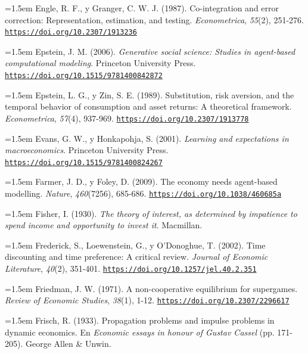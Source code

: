 \documentclass[10pt,a4paper]{article}
\begin{document}
\noindent\hangindent=1.5em Engle, R. F., y Granger, C. W. J. (1987). Co-integration and error correction: Representation, estimation, and testing. \textit{Econometrica}, \textit{55}(2), 251-276. \href{https://doi.org/10.2307/1913236}{\nolinkurl{https://doi.org/10.2307/1913236}}

\noindent\hangindent=1.5em Epstein, J. M. (2006). \textit{Generative social science: Studies in agent-based computational modeling}. Princeton University Press. \href{https://doi.org/10.1515/9781400842872}{\nolinkurl{https://doi.org/10.1515/9781400842872}}

\noindent\hangindent=1.5em Epstein, L. G., y Zin, S. E. (1989). Substitution, risk aversion, and the temporal behavior of consumption and asset returns: A theoretical framework. \textit{Econometrica}, \textit{57}(4), 937-969. \href{https://doi.org/10.2307/1913778}{\nolinkurl{https://doi.org/10.2307/1913778}}

\noindent\hangindent=1.5em Evans, G. W., y Honkapohja, S. (2001). \textit{Learning and expectations in macroeconomics}. Princeton University Press. \href{https://doi.org/10.1515/9781400824267}{\nolinkurl{https://doi.org/10.1515/9781400824267}}

\noindent\hangindent=1.5em Farmer, J. D., y Foley, D. (2009). The economy needs agent-based modelling. \textit{Nature}, \textit{460}(7256), 685-686. \href{https://doi.org/10.1038/460685a}{\nolinkurl{https://doi.org/10.1038/460685a}}

\noindent\hangindent=1.5em Fisher, I. (1930). \textit{The theory of interest, as determined by impatience to spend income and opportunity to invest it}. Macmillan.

\noindent\hangindent=1.5em Frederick, S., Loewenstein, G., y O'Donoghue, T. (2002). Time discounting and time preference: A critical review. \textit{Journal of Economic Literature}, \textit{40}(2), 351-401. \href{https://doi.org/10.1257/jel.40.2.351}{\nolinkurl{https://doi.org/10.1257/jel.40.2.351}}

\noindent\hangindent=1.5em Friedman, J. W. (1971). A non-cooperative equilibrium for supergames. \textit{Review of Economic Studies}, \textit{38}(1), 1-12. \href{https://doi.org/10.2307/2296617}{\nolinkurl{https://doi.org/10.2307/2296617}}

\noindent\hangindent=1.5em Frisch, R. (1933). Propagation problems and impulse problems in dynamic economics. En \textit{Economic essays in honour of Gustav Cassel} (pp. 171-205). George Allen \& Unwin.
\end{document}
